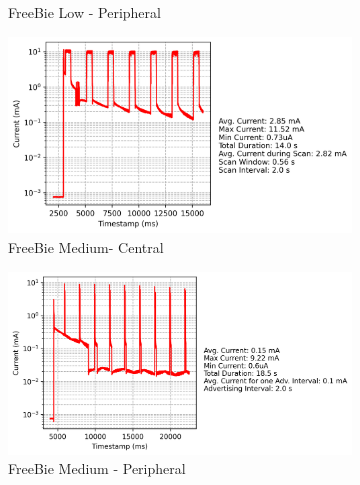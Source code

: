 \begin{figure}[t]
\begin{subfigure}{0.45\linewidth}
        \caption{FreeBie Low - Peripheral}
        \label{fig:freebie_low_peripheral}
        \vspace{1\baselineskip}
    \end{subfigure}
    \begin{subfigure}{0.45\linewidth}
        \centering
        \includegraphics[width=\linewidth]{chapters/Results/Current vs Timestamp - FreeBie Central Medium.png}
        \caption{FreeBie Medium- Central}
        \label{fig:freebie_medium_central}
        \vspace{1\baselineskip}
    \end{subfigure}\hfill
    \begin{subfigure}{0.45\linewidth}
        \centering
        \includegraphics[width=\linewidth]{chapters/Results/Current vs Timestamp - FreeBie Peripheral Medium.png}
        \caption{FreeBie Medium - Peripheral}
        \label{fig:freebie_medium_peripheral}
        \vspace{1\baselineskip}
    \end{subfigure}
    \begin{subfigure}{0.45\linewidth}
        \centering

\end{subfigure}
\end{figure}
